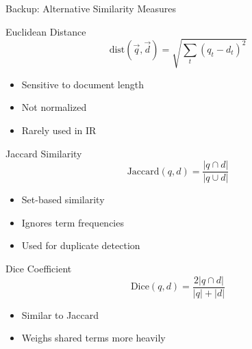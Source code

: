 \documentclass[aspectratio=169]{beamer}
\newif\ifanimated
\newcommand{\cpause}{\ifanimated\pause\fi}
\begin{document}
\begin{frame}[shrink=15]{Backup: Alternative Similarity Measures}
\begin{block}{Euclidean Distance}
$$\text{dist}(\vec{q}, \vec{d}) = \sqrt{\sum_t (q_t - d_t)^2}$$
\begin{itemize}
    \item \textcolor{red}{} Sensitive to document length
    \item \textcolor{red}{} Not normalized
    \item Rarely used in IR
\end{itemize}
\cpause
\end{block}
\cpause
\begin{block}{Jaccard Similarity}
$$\text{Jaccard}(q,d) = \frac{|q \cap d|}{|q \cup d|}$$
\begin{itemize}
    \item Set-based similarity
    \item \textcolor{red}{} Ignores term frequencies
    \item Used for duplicate detection
\end{itemize}
\cpause
\end{block}
\cpause
\begin{block}{Dice Coefficient}
$$\text{Dice}(q,d) = \frac{2|q \cap d|}{|q| + |d|}$$
\begin{itemize}
    \item Similar to Jaccard
    \item Weighs shared terms more heavily
\end{itemize}
\end{block}
\end{frame}
\end{document}
